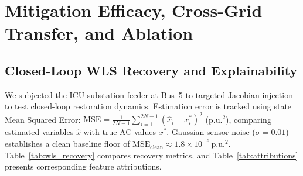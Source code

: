 \documentclass[runningheads]{llncs}
\begin{document}
\section{Mitigation Efficacy, Cross-Grid Transfer, and Ablation}
\label{sec:mitigation}

\subsection{Closed-Loop WLS Recovery and Explainability}
\label{sec:wls_recovery}

We subjected the ICU substation feeder at Bus~5 to targeted Jacobian injection to test closed-loop restoration dynamics.
Estimation error is tracked using state Mean Squared Error:
$\mathrm{MSE} = \frac{1}{2N-1} \sum_{i=1}^{2N-1} (\hat{x}_{i} - x_{i}^{*})^{2}$ (p.u.$^{2}$), comparing estimated variables $\hat{x}$ with true AC values $x^{*}$.
Gaussian sensor noise ($\sigma = 0.01$) establishes a clean baseline floor of $\mathrm{MSE}_{\mathrm{clean}} \approx 1.8 \times 10^{-6}$\,p.u.$^{2}$.
Table~\ref{tab:wls_recovery} compares recovery metrics, and Table~\ref{tab:attributions} presents corresponding feature attributions.

\begin{table}[t]
\begin{minipage}[t]{0.46\textwidth}
\caption{WLS state-estimation recovery under stealthy FDIA at Bus~5.}
\label{tab:wls_recovery}
\centering
{}
\end{minipage}\hfill
\begin{minipage}[t]{0.50\textwidth}
\caption{Feature attributions (IG) for Jacobian FDIA centered at Bus~5.}
\label{tab:attributions}
\centering
{}
\end{minipage}
\end{table}
\end{document}
